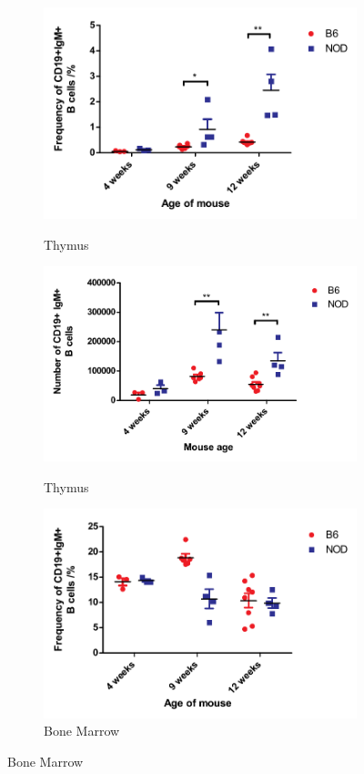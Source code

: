 \begin{figure}
	\begin{subfigure}{0.5\textwidth}
	\caption{Thymus}
	\includegraphics[width=\textwidth]{Figures/IncthyBcells.pdf}	
	\label{subfig:IncthyBcells}
	\end{subfigure}
	\begin{subfigure}{0.5\textwidth}
	\caption{Thymus}
	\includegraphics[width=\textwidth]{Figures/ThyBcellnumbers.pdf}
	\label{subfig:ThyBcellnumbers}
	\end{subfigure}
	\begin{subfigure}{0.5\textwidth}
	\caption{Bone Marrow}
	\includegraphics[width=\textwidth]{Figures/BMBcells.pdf}

\end{subfigure}
\end{figure}
